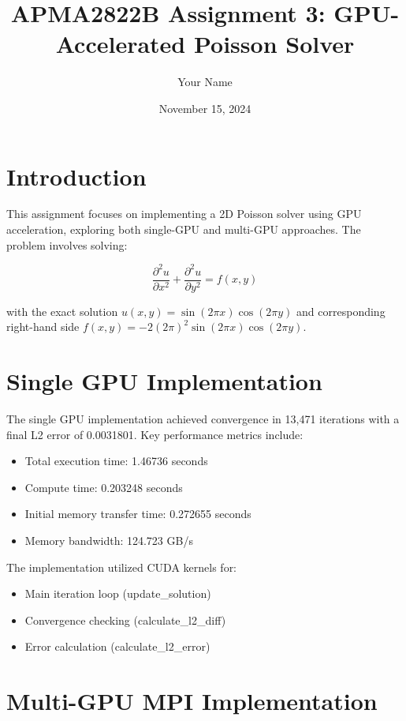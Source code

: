 \documentclass{article}
\title{APMA2822B Assignment 3: GPU-Accelerated Poisson Solver}
\author{Your Name}
\date{November 15, 2024}
\begin{document}
\maketitle
 
\section{Introduction}

This assignment focuses on implementing a 2D Poisson solver using GPU acceleration, exploring both single-GPU and multi-GPU approaches. The problem involves solving:

\begin{equation}
    \frac{\partial^2 u}{\partial x^2} + \frac{\partial^2 u}{\partial y^2} = f(x,y)
\end{equation}

with the exact solution $u(x,y) = \sin(2\pi x)\cos(2\pi y)$ and corresponding right-hand side $f(x,y) = -2(2\pi)^2\sin(2\pi x)\cos(2\pi y)$.

\section{Single GPU Implementation}

The single GPU implementation achieved convergence in 13,471 iterations with a final L2 error of 0.0031801. Key performance metrics include:

\begin{itemize}
    \item Total execution time: 1.46736 seconds
    \item Compute time: 0.203248 seconds
    \item Initial memory transfer time: 0.272655 seconds
    \item Memory bandwidth: 124.723 GB/s
\end{itemize}

The implementation utilized CUDA kernels for:
\begin{itemize}
    \item Main iteration loop (update\_solution)
    \item Convergence checking (calculate\_l2\_diff)
    \item Error calculation (calculate\_l2\_error)
\end{itemize}

\section{Multi-GPU MPI Implementation}
\end{document}
